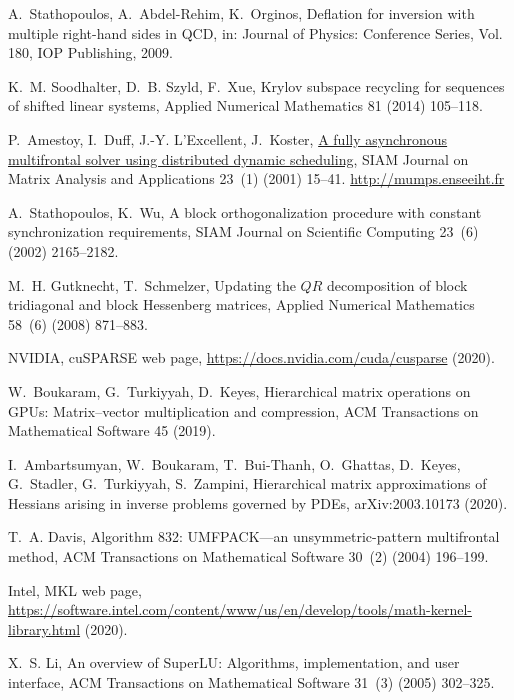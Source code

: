 \documentclass[3p,11pt]{elsarticle}
\begin{document}
\begin{thebibliography}{10}
A.~Stathopoulos, A.~Abdel-Rehim, K.~Orginos, Deflation for inversion with
  multiple right-hand sides in {QCD}, in: Journal of Physics: Conference
  Series, Vol. 180, IOP Publishing, 2009.

K.~M. Soodhalter, D.~B. Szyld, F.~Xue, Krylov subspace recycling for sequences
  of shifted linear systems, Applied Numerical Mathematics 81 (2014) 105--118.

P.~Amestoy, I.~Duff, J.-Y. L'Excellent, J.~Koster,
  \href{http://mumps.enseeiht.fr}{A fully asynchronous multifrontal solver
  using distributed dynamic scheduling}, SIAM Journal on Matrix Analysis and
  Applications 23~(1) (2001) 15--41.
\newline\urlprefix\url{http://mumps.enseeiht.fr}

A.~Stathopoulos, K.~Wu, A block orthogonalization procedure with constant
  synchronization requirements, SIAM Journal on Scientific Computing 23~(6)
  (2002) 2165--2182.

M.~H. Gutknecht, T.~Schmelzer, Updating the {$QR$} decomposition of block
  tridiagonal and block {H}essenberg matrices, {Applied Numerical Mathematics}
  58~(6) (2008) 871--883.

NVIDIA, {cuSPARSE} web page, \url{https://docs.nvidia.com/cuda/cusparse}
  (2020).

W.~Boukaram, G.~Turkiyyah, D.~Keyes, Hierarchical matrix operations on {GPU}s:
  Matrix--vector multiplication and compression, ACM Transactions on
  Mathematical Software 45 (2019).

I.~Ambartsumyan, W.~Boukaram, T.~Bui-Thanh, O.~Ghattas, D.~Keyes, G.~Stadler,
  G.~Turkiyyah, S.~Zampini, Hierarchical matrix approximations of {H}essians
  arising in inverse problems governed by {PDE}s, arXiv:2003.10173 (2020).

T.~A. Davis, Algorithm 832: {UMFPACK}—an unsymmetric-pattern multifrontal
  method, ACM Transactions on Mathematical Software 30~(2) (2004) 196--199.

Intel, {MKL} web page,
  \url{https://software.intel.com/content/www/us/en/develop/tools/math-kernel-library.html}
  (2020).

X.~S. Li, An overview of {S}uper{LU}: Algorithms, implementation, and user
  interface, ACM Transactions on Mathematical Software 31~(3) (2005) 302--325.


\end{thebibliography}
\end{document}
